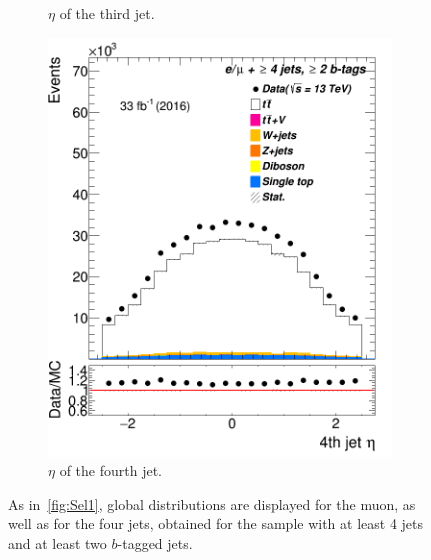 \begin{figure}
\begin{subfigure}{0.25\textwidth}
	\caption{$\eta$ of the third jet.} \label{fig:Sec25}
\end{subfigure}

\begin{subfigure}{0.25\textwidth}
	\includegraphics[width=\linewidth]{ControlPlots_emujets_2016_4incl_2incl/jet3_eta_emujets_2016.png}
	\caption{$\eta$ of the fourth jet.} \label{fig:Sec29}
\end{subfigure}



	
	\caption{As in~\cref{fig:Sel1}, global distributions are displayed for the muon, as well as for the four jets, obtained for the sample with at least 4 jets and at least two $b$-tagged jets.}	\label{fig:Sel2}
\end{figure}













